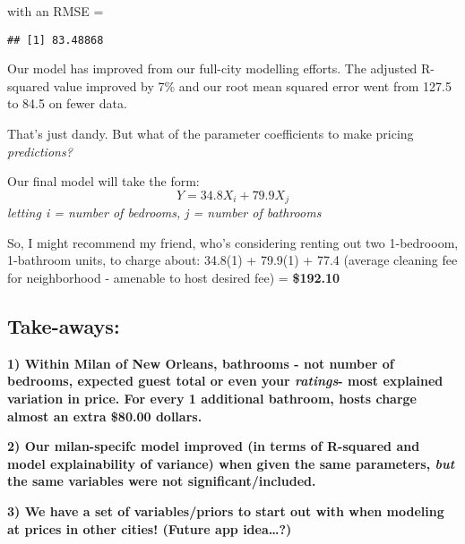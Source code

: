 \documentclass[]{article}
\begin{document}
with an RMSE =

\begin{verbatim}
## [1] 83.48868
\end{verbatim}

Our model has improved from our full-city modelling efforts. The
adjusted R-squared value improved by 7\% and our root mean squared error
went from 127.5 to 84.5 on fewer data.

That's just dandy. But what of the parameter coefficients to make
pricing \emph{predictions?}

Our final model will take the form: \[Y = 34.8X_i + 79.9X_j\]
\emph{letting i = number of bedrooms, j = number of bathrooms}

So, I might recommend my friend, who's considering renting out two
1-bedrooom, 1-bathroom units, to charge about: 34.8(1) + 79.9(1) + 77.4
(average cleaning fee for neighborhood - amenable to host desired fee) =
\textbf{\$192.10}

\hypertarget{take-aways}{%
\subsection{Take-aways:}\label{take-aways}}

\textbf{1) Within Milan of New Orleans, bathrooms - not number of
bedrooms, expected guest total or even your \emph{ratings}- most
explained variation in price. For every 1 additional bathroom, hosts
charge almost an extra \$80.00 dollars.}

\textbf{2) Our milan-specifc model improved (in terms of R-squared and
model explainability of variance) when given the same parameters,
\emph{but} the same variables were not significant/included.}

\textbf{3) We have a set of variables/priors to start out with when
modeling at prices in other cities! (Future app idea\ldots{}?)}
\end{document}
